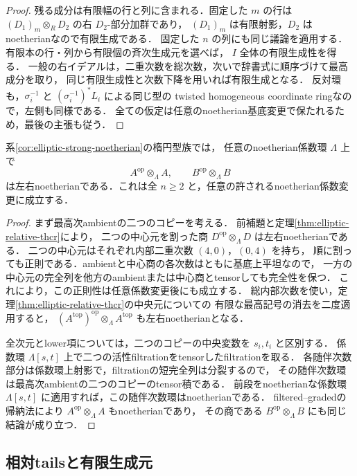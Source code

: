 \begin{proof}
残る成分は有限幅の行と列に含まれる．固定した $m$ の行は
$(D_1)_m\otimes_R D_2$ の右 $D_2$-部分加群であり，
$(D_1)_m$ は有限射影，$D_2$ はnoetherianなので有限生成である．
固定した $n$ の列にも同じ議論を適用する．有限本の行・列から有限個の斉次生成元を選べば，
$I$ 全体の有限生成性を得る．
一般の右イデアルは，二重次数を総次数，次いで辞書式に順序づけて最高成分を取り，
同じ有限生成性と次数下降を用いれば有限生成となる．
反対環も，$\sigma_i^{-1}$ と $(\sigma_i^{-1})^*L_i$ による同じ型の
twisted homogeneous coordinate ringなので，左側も同様である．
全ての仮定は任意のnoetherian基底変更で保たれるため，最後の主張も従う．
\end{proof}

\begin{corollary}\label{cor:elliptic-product-noetherian}
系\ref{cor:elliptic-strong-noetherian}の楕円型族では，
任意のnoetherian係数環 $\Lambda$ 上で
\[
 A^{\mathrm{op}}\otimes_\Lambda A,\qquad
 B^{\mathrm{op}}\otimes_\Lambda B
\]
は左右noetherianである．これは全 $n\ge2$ と，任意の許されるnoetherian係数変更に成立する．
\end{corollary}
\begin{proof}
まず最高次ambientの二つのコピーを考える．
前補題と定理\ref{thm:elliptic-relative-thcr}により，
二つの中心元を割った商 $D^{\mathrm{op}}\otimes_\Lambda D$ は左右noetherianである．
二つの中心元はそれぞれ内部二重次数 $(4,0)$，$(0,4)$ を持ち，
順に割っても正則である．ambientと中心商の各次数はともに基底上平坦なので，
一方の中心元の完全列を他方のambientまたは中心商とtensorしても完全性を保つ．
これにより，この正則性は任意係数変更後にも成立する．
総内部次数を使い，定理\ref{thm:elliptic-relative-thcr}の中央元についての
有限な最高記号の消去を二度適用すると，
$(A^{\mathrm{top}})^{\mathrm{op}}\otimes_\Lambda A^{\mathrm{top}}$ も左右noetherianとなる．

全次元とlower項については，二つのコピーの中央変数を $s_i,t_i$ と区別する．
係数環 $\Lambda[s,t]$ 上で二つの活性filtrationをtensorしたfiltrationを取る．
各随伴次数部分は係数環上射影で，filtrationの短完全列は分裂するので，
その随伴次数環は最高次ambientの二つのコピーのtensor積である．
前段をnoetherianな係数環 $\Lambda[s,t]$ に適用すれば，この随伴次数環はnoetherianである．
filtered--gradedの帰納法により $A^{\mathrm{op}}\otimes_\Lambda A$ もnoetherianであり，
その商である $B^{\mathrm{op}}\otimes_\Lambda B$ にも同じ結論が成り立つ．
\end{proof}

\subsection{相対tailsと有限生成元}

